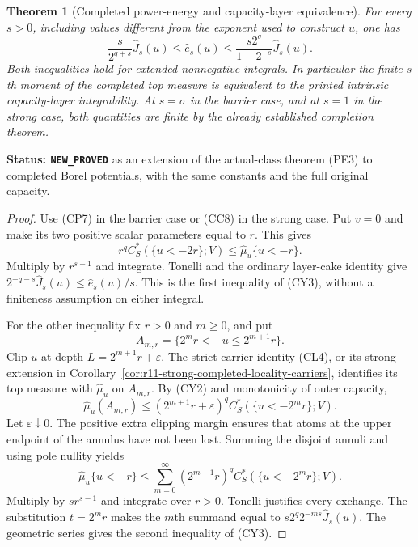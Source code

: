 \documentclass[11pt,a4paper]{article}
\numberwithin{equation}{section}
\newtheorem{theorem}{Theorem}[section]
\theoremstyle{definition}
\theoremstyle{remark}
\begin{document}
\begin{theorem}[Completed power-energy and capacity-layer equivalence]
\label{thm:r11-completed-energy-capacity-layers}
For every $s>0$, including values different from the exponent
used to construct $u$, one has
\[
       \boxed{\qquad
       \frac{s}{2^{q+s}}\widehat J_s(u)
             \leq\widehat e_s(u)
             \leq\frac{s2^q}{1-2^{-s}}\widehat J_s(u).
       \qquad}
 \tag{CY3}
\]
Both inequalities hold for extended nonnegative integrals.
In particular the finite $s$th moment of the completed top
measure is equivalent to the printed intrinsic capacity-layer
integrability. At $s=\sigma$ in the barrier case, and at $s=1$
in the strong case, both quantities are finite by the already
established completion theorem.
\end{theorem}

\noindent\textbf{Status: \texttt{NEW\_PROVED}} as an extension
of the actual-class theorem (PE3) to completed Borel potentials,
with the same constants and the full original capacity.

\begin{proof}
Use (CP7) in the barrier case or (CC8) in the strong case.
Put $v=0$ and make its two positive scalar parameters equal
to $r$. This gives
\[
                    r^q C_S^*(\{u<-2r\};V)
                                 \leq\widehat\mu_u\{u<-r\}.
 \tag{CY4}
\]
Multiply by $r^{s-1}$ and integrate. Tonelli and the ordinary
layer-cake identity give
$2^{-q-s}\widehat J_s(u)\leq\widehat e_s(u)/s$.
This is the first inequality of (CY3), without a finiteness
assumption on either integral.

For the other inequality fix $r>0$ and $m\geq0$, and put
\[
                         A_{m,r}
                 =\{2^m r<-u\leq2^{m+1}r\}.
\]
Clip $u$ at depth $L=2^{m+1}r+\varepsilon$.
The strict carrier identity (CL4), or its strong extension in
Corollary~\ref{cor:r11-strong-completed-locality-carriers}, identifies its top measure
with $\widehat\mu_u$ on $A_{m,r}$.
By (CY2) and monotonicity of outer capacity,
\[
 \widehat\mu_u(A_{m,r})
    \leq (2^{m+1}r+\varepsilon)^q
                           C_S^*(\{u<-2^m r\};V).
\]
Let $\varepsilon\downarrow0$. The positive extra clipping
margin ensures that atoms at the upper endpoint of the
annulus have not been lost. Summing the disjoint annuli and
using pole nullity yields
\[
 \widehat\mu_u\{u<-r\}
    \leq\sum_{m=0}^\infty(2^{m+1}r)^q
                           C_S^*(\{u<-2^m r\};V).
 \tag{CY5}
\]
Multiply by $s r^{s-1}$ and integrate over $r>0$.
Tonelli justifies every exchange. The substitution $t=2^m r$
makes the $m$th summand equal to
$s2^q2^{-ms}\widehat J_s(u)$.
The geometric series gives the second inequality of (CY3).
\end{proof}
\end{document}

